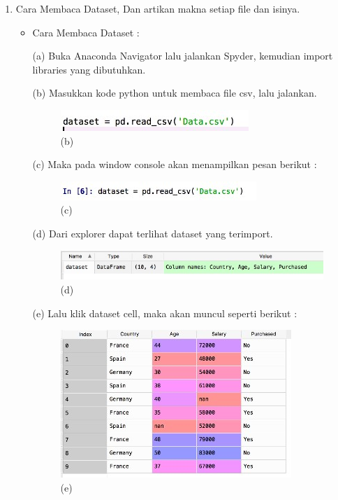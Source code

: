 \begin{enumerate}
\item Cara Membaca Dataset, Dan artikan makna setiap file dan isinya.
\begin{itemize}
\item Cara Membaca Dataset :
\par (a) Buka Anaconda Navigator lalu jalankan Spyder, kemudian import libraries yang dibutuhkan.
\par (b) Masukkan kode python untuk membaca file csv, lalu jalankan.
\begin{figure}[ht]
\centering
\includegraphics[scale=0.5]{figures/21.jpeg}
\caption{(b)}
\label{contoh}
\end{figure}
\par (c) Maka pada window console akan menampilkan pesan berikut :
\begin{figure}[ht]
\centering
\includegraphics[scale=0.9]{figures/22.jpeg}
\caption{(c)}
\label{contoh}
\end{figure}
\par (d) Dari explorer dapat terlihat dataset yang terimport.
\begin{figure}[ht]
\centering
\includegraphics[scale=0.6]{figures/23.jpeg}
\caption{(d)}
\label{contoh}
\end{figure}
\par (e) Lalu klik dataset cell, maka akan muncul seperti berikut :
\begin{figure}[ht]
\centering
\includegraphics[scale=0.9]{figures/24.jpeg}
\caption{(e)}
\label{contoh}
\end{figure}

\end{itemize}
\end{enumerate}

